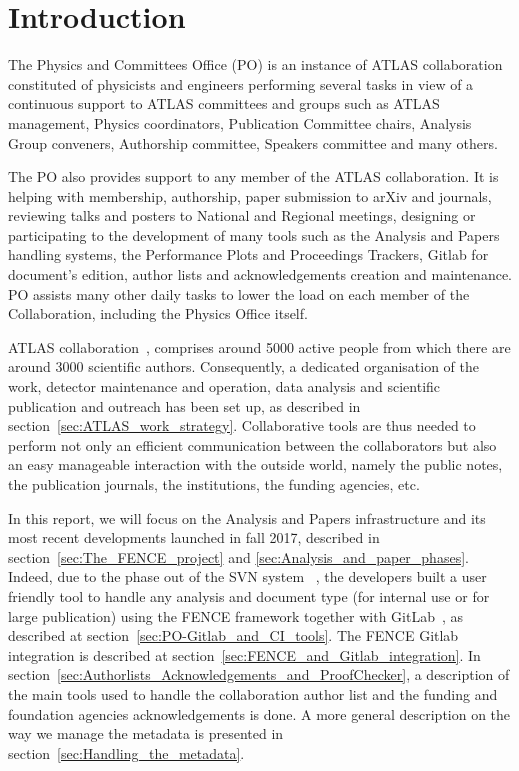 \section{Introduction}
\label{sec:Introduction}
The Physics and Committees Office (PO) is an instance of ATLAS collaboration constituted of physicists and engineers performing several tasks in view of a continuous support to ATLAS committees and groups such as ATLAS management, Physics coordinators, Publication Committee chairs, Analysis Group conveners, Authorship committee, Speakers 
committee and many others.
                    
The PO also provides support to any member of the ATLAS collaboration. It is helping with membership, authorship, paper submission to arXiv and journals, reviewing talks and posters to National and Regional meetings, designing or participating to the development of many tools such as the Analysis and Papers handling systems, the Performance Plots and Proceedings Trackers, Gitlab for document’s edition, author lists and acknowledgements creation and maintenance. PO assists many other daily tasks to lower the load on each member of the Collaboration, including the Physics Office itself.

ATLAS collaboration~\cite{atlas_collab}, comprises around 5000 active people from which there are around 3000 scientific authors. Consequently, a dedicated organisation of the work, detector maintenance and operation, data analysis and scientific publication and outreach has been set up, as described in section~\ref{sec:ATLAS_work_strategy}. Collaborative tools are thus needed to perform not only an efficient communication between the collaborators but also an easy manageable interaction with the outside world, namely the public notes, the publication journals, the institutions, the funding agencies, etc.
                    
In this report, we will focus on the Analysis and Papers infrastructure and its most recent developments launched in fall 2017, described in section~\ref{sec:The_FENCE_project} and \ref{sec:Analysis_and_paper_phases}. Indeed, due to the phase out of the SVN system~\cite{svn} , the developers built a user friendly tool to handle any analysis and document type (for internal use or for large publication) using the FENCE framework  together with GitLab~\cite{gitlab}, as described at section~\ref{sec:PO-Gitlab_and_CI_tools}. The FENCE Gitlab integration is described at section~\ref{sec:FENCE_and_Gitlab_integration}. In section~\ref{sec:Authorlists_Acknowledgements_and_ProofChecker}, a description of the main tools used to handle the collaboration author list and the funding and foundation agencies acknowledgements is done. A more general description on the way we manage the metadata is presented in section~\ref{sec:Handling_the_metadata}.
